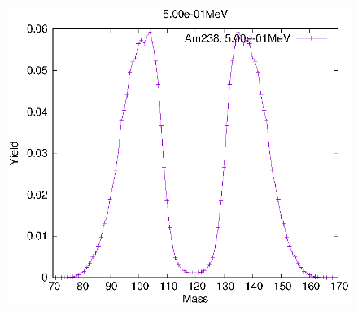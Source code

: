 \begin{figure}[htbp]
\begin{minipage}{0.33\textwidth} \begin{center} \includegraphics[width=\textwidth]{YA/Am238_5.00e-01.eps} \end{center} \end{minipage}
\end{figure}
